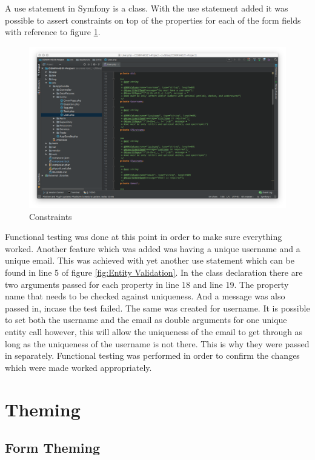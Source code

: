 A use statement in Symfony is a class. With the use statement added it was possible to assert constraints on top of the properties for each of the form fields with reference to figure \ref{fig:Constraints}.

\begin{figure}[htbp]
   \centering
   \includegraphics[width=400pt]{figures/assert_constraints.png} %
   \caption{Constraints}
   \label{fig:Constraints}
\end{figure}

Functional testing was done at this point in order to make sure everything worked. Another feature which was added was having a unique username and a unique email. This was achieved with yet another use statement which can be found in line 5 of figure \ref{fig:Entity Validation}. In the class declaration there are two arguments passed for each property in line 18 and line 19. The property name that needs to be checked against uniqueness. And a message was also passed in, incase the test failed. The same was created for username. It is possible to set both the username and the email as double arguments for one unique entity call however, this will allow the uniqueness of the email to get through as long as the uniqueness of the username is not there. This is why they were passed in separately. Functional testing was performed in order to confirm the changes which were made worked appropriately.

\section{Theming}

\subsection{Form Theming}

